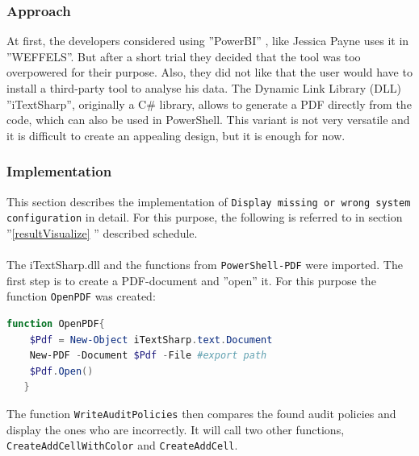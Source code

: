 \subsubsection{Approach}
At first, the developers considered using ''PowerBI'' \cite{PowerBI}, like Jessica Payne uses it in ''WEFFELS''. But after a short trial they decided that the tool was too overpowered for their purpose. Also, they did not like that the user would have to install a third-party tool to analyse his data. The Dynamic Link Library (DLL) ''iTextSharp'', originally a C\# library, allows to generate a PDF directly from the code, which can also be used in PowerShell. This variant is not very versatile and it is difficult to create an appealing design, but it is enough for now. 

\subsubsection{Implementation}
This section describes the implementation of \lstinline|Display missing or wrong system configuration| in detail. For this purpose, the following is referred to in section ''\ref{resultVisualize} '' described schedule. \\\\
The iTextSharp.dll and the functions from \lstinline|PowerShell-PDF| \cite{PowerShell-PDF} were imported. The first step is to create a PDF-document and ''open'' it. For this purpose the function \lstinline|OpenPDF| was created:
\begin{lstlisting}[caption=Function OpenPDF, language=PowerShell]
function OpenPDF{
    $Pdf = New-Object iTextSharp.text.Document 
    New-PDF -Document $Pdf -File #export path
    $Pdf.Open()
   }
\end{lstlisting}
The function \lstinline|WriteAuditPolicies| then compares the found audit policies and display the ones who are incorrectly. It will call two other functions, \lstinline|CreateAddCellWithColor| and \lstinline|CreateAddCell|.
